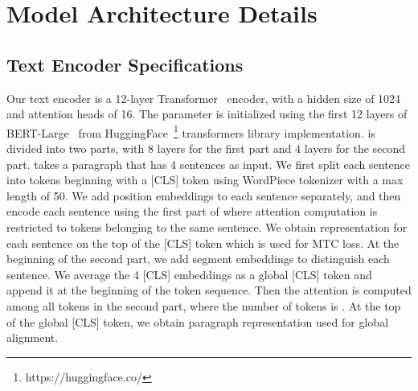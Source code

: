 \documentclass{article}
\begin{document}
\section{Model Architecture Details}\label{sec:app_model}
\subsection{Text Encoder Specifications}
Our text encoder  is a 12-layer Transformer~\cite{vaswani2017transformer} encoder, with a hidden size of 1024 and attention heads of 16. 
The parameter is initialized using the first 12 layers of BERT-Large~\cite{Devlin2018bert} from HuggingFace~\footnote{https://huggingface.co/} transformers library implementation.
 is divided into two parts, with 8 layers for the first part and 4 layers for the second part.
 takes a paragraph that has 4 sentences as input.
We first split each sentence into tokens beginning with a [CLS] token using WordPiece tokenizer with a max length of 50. 
We add position embeddings to each sentence separately, and then encode each sentence using the first part of  where attention computation is restricted to tokens belonging to the same sentence.
We obtain representation for each sentence on the top of the [CLS] token which is used for MTC loss.
At the beginning of the second part, we add segment embeddings to distinguish each sentence. We average the 4 [CLS] embeddings as a global [CLS] token and append it at the beginning of the  token sequence. 
Then the attention is computed among all tokens in the second part, where the number of tokens is . 
At the top of the global [CLS] token, we obtain paragraph representation used for global alignment.
\end{document}
